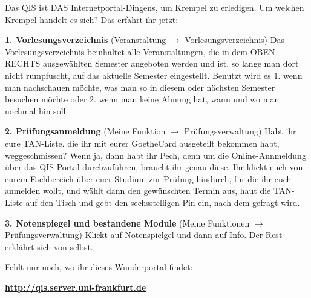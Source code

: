 Das QIS ist DAS Internetportal-Dingens, um Krempel zu erledigen.
Um welchen Krempel handelt es sich? Das erfahrt ihr jetzt:

\textbf{1. Vorlesungsverzeichnis} (Veranstaltung $\rightarrow$ Vorlesungsverzeichnis)
Das Vorlesungsverzeichnis beinhaltet alle Veranstaltungen, die in dem OBEN RECHTS ausgewählten
Semester angeboten werden und ist, so lange man dort nicht rumpfuscht, auf das aktuelle Semester eingestellt.
Benutzt wird es 1. wenn man nachschauen möchte, was man so in diesem oder nächsten Semester besuchen möchte oder
2. wenn man keine Ahnung hat, wann und wo man nochmal hin soll.

\textbf{2. Prüfungsanmeldung} (Meine Funktion $\rightarrow$ Prüfungsverwaltung)
Habt ihr eure TAN-Liste, die ihr mit eurer GoetheCard ausgeteilt bekommen habt, weggeschmissen?
Wenn ja, dann habt ihr Pech, denn um die Online-Annmeldung über das QIS-Portal durchzuführen,
braucht ihr genau diese. Ihr klickt euch von eurem Fachbereich über euer Studium zur Prüfung hindurch, für die ihr euch anmelden wollt,
und wählt dann den gewünschten Termin aus, haut die TAN-Liste auf den Tisch und gebt den sechsstelligen Pin ein, nach dem gefragt wird.

\textbf{3. Notenspiegel und bestandene Module} (Meine Funktionen $\rightarrow$ Prüfungsverwaltung)
Klickt auf Notenspielgel und dann auf Info. Der Rest erklährt sich von selbst.

Fehlt nur noch, wo ihr dieses Wunderportal findet:\\
\begin{center}\large\textbf{\url{http://qis.server.uni-frankfurt.de}}\end{center}
